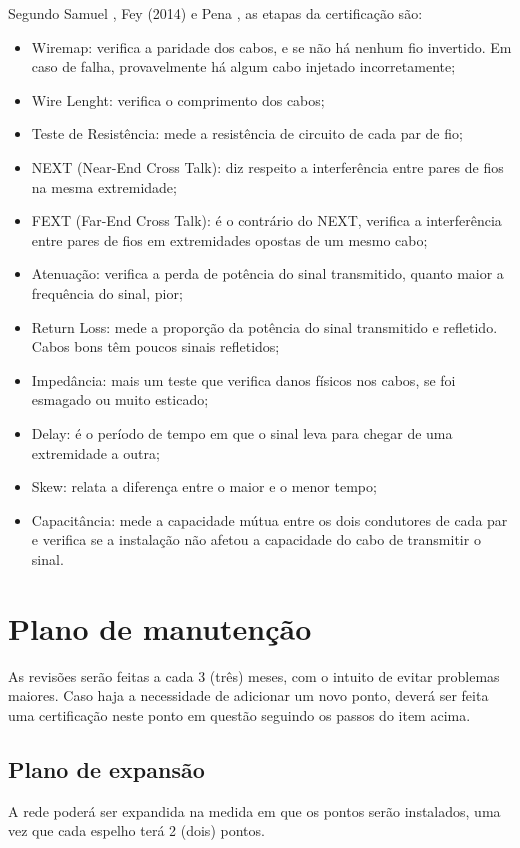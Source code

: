 \documentclass[	DIV=calc,%
							paper=a4,%
							fontsize=12pt,%
							onecolumn]{scrartcl}	 					%
\begin{document}
Segundo Samuel \cite{ref2}, Fey (2014) \cite{ref1} e Pena \cite{ref3}, as etapas da certificação são:
\begin{itemize}
	\item Wiremap: verifica a paridade dos cabos, e se não há nenhum fio invertido. Em caso de falha, provavelmente há algum cabo injetado incorretamente;
	\item Wire Lenght: verifica o comprimento dos cabos;
	\item Teste de Resistência: mede a resistência de circuito de cada par de fio;
	\item NEXT (Near-End Cross Talk): diz respeito a interferência entre pares de fios na mesma extremidade;
	\item FEXT (Far-End Cross Talk): é o contrário do NEXT, verifica a interferência entre pares de fios em extremidades opostas de um mesmo cabo;
	\item Atenuação: verifica a perda de potência do sinal transmitido, quanto maior a frequência do sinal, pior;
	\item Return Loss: mede a proporção da potência do sinal transmitido e refletido. Cabos bons têm poucos sinais refletidos;
	\item Impedância: mais um teste que verifica danos físicos nos cabos, se foi esmagado ou muito esticado;
	\item Delay: é o período de tempo em que o sinal leva para chegar de uma extremidade a outra;
	\item Skew: relata a diferença entre o maior e o menor tempo;
	\item Capacitância: mede a capacidade mútua entre os dois condutores de cada par e verifica se a instalação não afetou a capacidade do cabo de transmitir o sinal.

\end{itemize}



\section{Plano de manutenção}

As revisões serão feitas a cada 3 (três) meses, com o intuito de evitar problemas maiores. Caso haja a necessidade de adicionar um novo ponto, deverá ser feita uma certificação neste ponto em questão seguindo os passos do item acima. 

\subsection{Plano de expansão}
A rede poderá ser expandida na medida em que os pontos serão instalados, uma vez que cada espelho terá 2 (dois) pontos.
\end{document}
